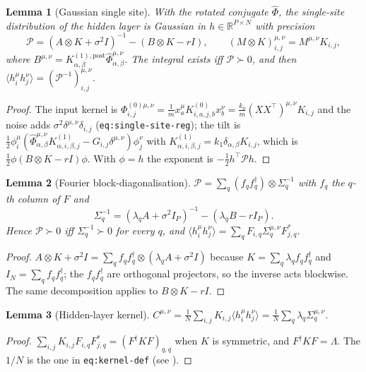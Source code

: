 \documentclass[11pt,a4paper]{article}
\newcommand{\R}{\mathbb R}
\newtheorem{lemma}{Lemma}
\theoremstyle{remark}
\begin{document}
\begin{lemma}[Gaussian single site]\label{lem:gauss}
With the rotated conjugate $\hat\Phi$, the single-site distribution of the hidden layer is Gaussian in $h \in \R^{P\times N}$ with precision
\begin{equation}
  \mathcal P = (A\otimes K + \sigma^2 I)^{-1} - (B\otimes K - r I),
  \qquad (M\otimes K)^{\mu,\nu}_{i,j} = M^{\mu,\nu}K_{i,j},
  \label{eq:precision}
\end{equation}
where $B^{\mu,\nu} = K^{(1),\mathrm{post}}_{\alpha,\beta}\hat\Phi^{\mu,\nu}_{\alpha,\beta}$. The integral exists iff $\mathcal P \succ 0$, and then $\langle h^\mu_i h^\nu_j\rangle = (\mathcal P^{-1})^{\mu,\nu}_{i,j}$.
\end{lemma}
\begin{proof}
The input kernel is $\Phi^{(0)\mu,\nu}_{i,j} = \frac1m x^\mu_a K^{(0)}_{i,a,j,b} x^\nu_b = \frac{k_0}{m}(XX^\top)^{\mu,\nu}K_{i,j}$ and the noise adds $\sigma^2\delta^{\mu,\nu}\delta_{i,j}$ (\texttt{eq:single-site-reg}); the tilt is $\frac12\phi^\mu_i(\hat\Phi^{\mu,\nu}_{\alpha,\beta}K^{(1)}_{\alpha,i,\beta,j} - G_{i,j}\delta^{\mu,\nu})\phi^\nu_j$ with $K^{(1)}_{\alpha,i,\beta,j} = k_1\delta_{\alpha,\beta}K_{i,j}$, which is $\frac12\phi(B\otimes K - rI)\phi$. With $\phi = h$ the exponent is $-\frac12 h^\top\mathcal P h$.
\end{proof}

\begin{lemma}[Fourier block-diagonalisation]\label{lem:fourier}
$\mathcal P = \sum_q (f_q f_q^\dagger)\otimes\Sigma_q^{-1}$ with $f_q$ the $q$-th column of $F$ and
\begin{equation}
  \Sigma_q^{-1} = (\lambda_q A + \sigma^2 I_P)^{-1} - (\lambda_q B - r I_P) .
  \label{eq:sigma-q}
\end{equation}
Hence $\mathcal P \succ 0$ iff $\Sigma_q^{-1}\succ0$ for every $q$, and $\langle h^\mu_i h^\nu_j\rangle = \sum_q F_{i,q}\Sigma_q^{\mu,\nu}F^*_{j,q}$.
\end{lemma}
\begin{proof}
$A\otimes K + \sigma^2 I = \sum_q f_qf_q^\dagger\otimes(\lambda_q A + \sigma^2 I)$ because $K = \sum_q\lambda_q f_qf_q^\dagger$ and $I_N = \sum_q f_qf_q^\dagger$; the $f_qf_q^\dagger$ are orthogonal projectors, so the inverse acts blockwise. The same decomposition applies to $B\otimes K - r I$.
\end{proof}

\begin{lemma}[Hidden-layer kernel]\label{lem:C}
$C^{\mu,\nu} = \frac1N\sum_{i,j}K_{i,j}\langle h^\mu_i h^\nu_j\rangle = \frac1N\sum_q\lambda_q\Sigma_q^{\mu,\nu}$.
\end{lemma}
\begin{proof}
$\sum_{i,j}K_{i,j}F_{i,q}F^*_{j,q} = (F^\dagger K F)_{q,q}$ when $K$ is symmetric, and $F^\dagger KF = \Lambda$. The $1/N$ is the one in \texttt{eq:kernel-def} (see ).
\end{proof}
\end{document}
